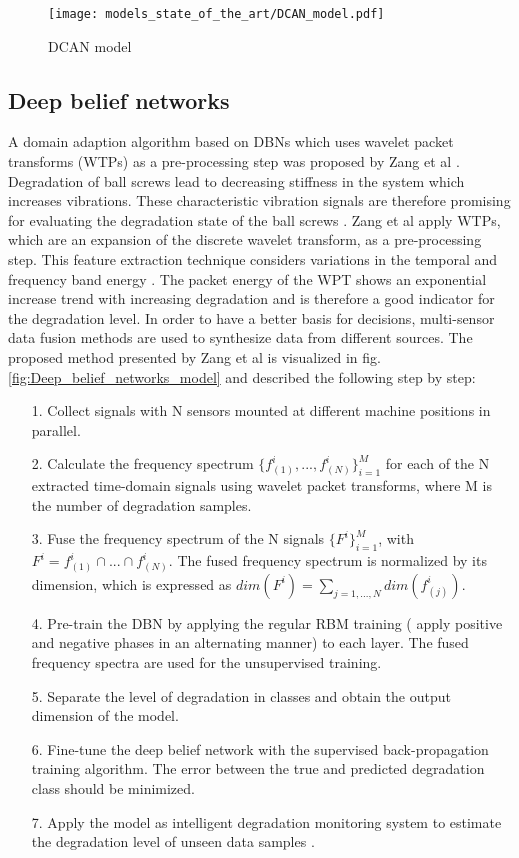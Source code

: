 {\begin{figure}[H]
  \centering
  \texttt{[image: models\_state\_of\_the\_art/DCAN\_model.pdf]}
  \caption{DCAN model \cite{li2020}}
  \label{fig:DCAN_model}
\end{figure}

\subsection{Deep belief networks}
A domain adaption algorithm based on DBNs which uses wavelet packet transforms (WTPs) as a pre-processing step was proposed by Zang et al \cite{Zhang2017}. Degradation of ball screws lead to decreasing stiffness in the system which increases vibrations. These characteristic vibration signals are therefore promising for evaluating the degradation state of the ball screws \cite{Zhang2017}. Zang et al apply WTPs, which are an expansion of the discrete wavelet transform, as a pre-processing step. This feature extraction technique considers variations in the temporal and frequency band energy \cite{Besbes2016}. The packet energy of the WPT shows an exponential increase trend with increasing degradation and is therefore a good indicator for the degradation level. In order to have a better basis for decisions, multi-sensor data fusion methods are used to synthesize data from different sources. The proposed method presented by Zang et al is visualized in fig. \ref{fig:Deep_belief_networks_model} and described the following step by step:

\begin{itemize}
    \item [1.] Collect signals with N sensors mounted at different machine positions in parallel.
    \item [2.] Calculate the frequency spectrum $\{f_{(1)}^{i}, ..., f_{(N)}^{i}\}_{i=1}^{M}$ for each of the N extracted time-domain signals using wavelet packet transforms, where M is the number of degradation samples.
    \item [3.] Fuse the frequency spectrum of the N signals $\{F^{i}\}_{i=1}^{M}$, with $F^{i}=f_{(1)}^{i} \cap ... \cap f_{(N)}^{i}$. The fused frequency spectrum is normalized by its dimension, which is expressed as $dim(F^{i})=\sum_{j=1,...,N} dim(f_{(j)}^{i})$.
    \item [4.] Pre-train the DBN by applying the regular RBM training ( apply positive and negative phases in an alternating manner) to each layer. The fused frequency spectra are used for the unsupervised training. 
    \item [5.] Separate the level of degradation in classes and obtain the output dimension of the model.
    \item [6.]  Fine-tune the deep belief network with the supervised back-propagation training algorithm. The error between the true and predicted degradation class should be minimized.
    \item [7.] Apply the model as intelligent degradation monitoring system to estimate the degradation level of unseen data samples \cite{Zhang2017}.
\end{itemize}

}
